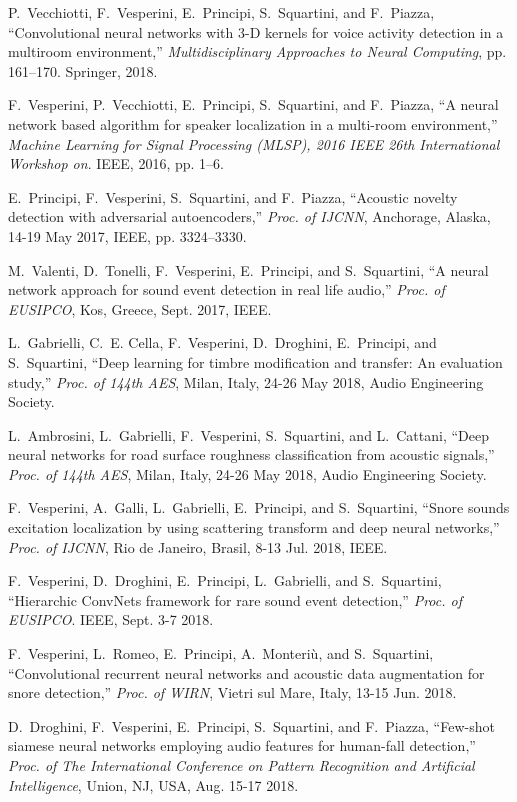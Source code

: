\begin{list}{[]~}{}
\item
P.~Vecchiotti, F.~Vesperini, E.~Principi, S.~Squartini, and F.~Piazza, ``Convolutional neural networks with 3-{D} kernels for voice activity detection in a multiroom environment,'' \emph{Multidisciplinary Approaches to Neural Computing}, pp. 161--170. Springer, 2018.

\item
F.~Vesperini, P.~Vecchiotti, E.~Principi, S.~Squartini, and F.~Piazza, ``A neural network based algorithm for speaker localization in a multi-room environment,'' \emph{Machine Learning for Signal Processing (MLSP), 2016 IEEE 26th International Workshop on}. IEEE, 2016, pp. 1--6.

\item
E.~Principi, F.~Vesperini, S.~Squartini, and F.~Piazza, ``Acoustic novelty detection with adversarial autoencoders,'' \emph{Proc. of IJCNN}, Anchorage, Alaska, 14-19 May 2017, IEEE, pp. 3324--3330.

\item
M.~Valenti, D.~Tonelli, F.~Vesperini, E.~Principi, and S.~Squartini, ``A neural network approach for sound event detection in real life audio,'' \emph{Proc. of EUSIPCO}, Kos, Greece, Sept. 2017, IEEE.

\item
L.~Gabrielli, C.~E. Cella, F.~Vesperini, D.~Droghini, E.~Principi, and S.~Squartini, ``Deep learning for timbre modification and transfer: An evaluation study,'' \emph{Proc. of 144th AES}, Milan, Italy, 24-26 May 2018, Audio Engineering Society.

\item
L.~Ambrosini, L.~Gabrielli, F.~Vesperini, S.~Squartini, and L.~Cattani, ``Deep neural networks for road surface roughness classification from acoustic signals,'' \emph{Proc. of 144th AES}, Milan, Italy, 24-26 May 2018, Audio Engineering Society.

\item
F.~Vesperini, A.~Galli, L.~Gabrielli, E.~Principi, and S.~Squartini, ``Snore sounds excitation localization by using scattering transform and deep neural networks,'' \emph{Proc. of IJCNN}, Rio de Janeiro, Brasil, 8-13 Jul. 2018, IEEE.

\item
F.~Vesperini, D.~Droghini, E.~Principi, L.~Gabrielli, and S.~Squartini, ``Hierarchic {C}onv{N}ets framework for rare sound event detection,'' \emph{Proc. of EUSIPCO}. IEEE, Sept. 3-7 2018.

\item
F.~Vesperini, L.~Romeo, E.~Principi, A.~Monteri\`{u}, and S.~Squartini, ``Convolutional recurrent neural networks and acoustic data augmentation for snore detection,'' \emph{Proc. of WIRN}, Vietri sul Mare, Italy, 13-15 Jun. 2018.

\item
D.~Droghini, F.~Vesperini, E.~Principi, S.~Squartini, and F.~Piazza, ``Few-shot siamese neural networks employing audio features for human-fall detection,'' \emph{Proc. of The International Conference on Pattern Recognition and Artificial Intelligence}, Union, NJ, USA, Aug. 15-17 2018.

  
\end{list}
